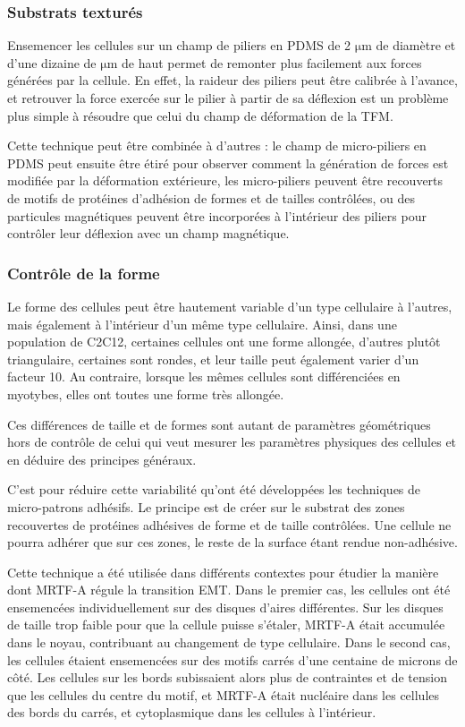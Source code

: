 \documentclass{report}
\newcommand{\micro}{$\mathrm{\mu}$}
\begin{document}
\subsubsection{Substrats texturés}

Ensemencer les cellules sur un champ de piliers en PDMS de 2 \micro m de diamètre et d'une dizaine de \micro m de haut permet de remonter plus facilement aux forces générées par la cellule. 
En effet, la raideur des piliers peut être calibrée à l'avance, et retrouver la force exercée sur le pilier à partir de sa déflexion est un problème plus simple à résoudre que celui du champ de déformation de la TFM. 

Cette technique peut être combinée à d'autres : le champ de micro-piliers en PDMS peut ensuite être étiré pour observer comment la génération de forces est modifiée par la déformation extérieure, les micro-piliers peuvent être recouverts de motifs de protéines d'adhésion de formes et de tailles contrôlées, ou des particules magnétiques peuvent être incorporées à l'intérieur des piliers pour contrôler leur déflexion avec un champ magnétique. 

\subsubsection{Contrôle de la forme}

Le forme des cellules peut être hautement variable d'un type cellulaire à l'autres, mais également à l'intérieur d'un même type cellulaire. 
Ainsi, dans une population de C2C12, certaines cellules ont une forme allongée, d'autres plutôt triangulaire, certaines sont rondes, et leur taille peut également varier d'un facteur 10. Au contraire, lorsque les mêmes cellules sont différenciées en myotybes, elles ont toutes une forme très allongée. 

Ces différences de taille et de formes sont autant de paramètres géométriques hors de contrôle de celui qui veut mesurer les paramètres physiques des cellules et en déduire des principes généraux. 

C'est pour réduire cette variabilité qu'ont été développées les techniques de micro-patrons adhésifs. 
Le principe est de créer sur le substrat des zones recouvertes de protéines adhésives de forme et de taille contrôlées.
Une cellule ne pourra adhérer que sur ces zones, le reste de la surface étant rendue non-adhésive. 

Cette technique a été utilisée dans différents contextes pour étudier la manière dont MRTF-A régule la transition EMT. 
Dans le premier cas, les cellules ont été ensemencées individuellement sur des disques d'aires différentes. Sur les disques de taille trop faible pour que la cellule puisse s'étaler, MRTF-A était accumulée dans le noyau, contribuant au changement de type cellulaire. 
Dans le second cas, les cellules étaient ensemencées sur des motifs carrés d'une centaine de microns de côté. Les cellules sur les bords subissaient alors plus de contraintes et de tension que les cellules du centre du motif, et MRTF-A était nucléaire dans les cellules des bords du carrés, et cytoplasmique dans les cellules à l'intérieur.
\end{document}
